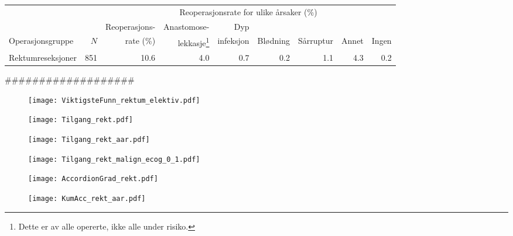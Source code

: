 \documentclass[norsk,a4paper]{article}\usepackage[]{graphicx}\usepackage[]{color}
\begin{document}
\begin{table}[htb]
\begin{minipage}{\textwidth}
\centering
\begin{tabular}{lrrrrrrrr}
  \toprule
  & & & \multicolumn{4}{c}{Reoperasjonsrate for ulike årsaker (\%)} \\
 \cline{4-9} 
 & & Reoperasjons- & Anastomose- & Dyp &&&&  \\
 Operasjonsgruppe & $N$ & rate (\%) & lekkasje\footnote[2]{Dette er av alle opererte, ikke
alle under risiko.} & infeksjon & Blødning & Sårruptur & Annet & Ingen \\
 \midrule
Rektumreseksjoner & 851 & 10.6 & 4.0 & 0.7 & 0.2 & 1.1 & 4.3 & 0.2 \\ 
   \bottomrule
\end{tabular}

\end{minipage}
\end{table}



###################




\begin{figure}[ht]
\centering
\texttt{[image: ViktigsteFunn\_rektum\_elektiv.pdf]}
\caption{}
\end{figure}

\begin{figure}[ht]
\centering
\texttt{[image: Tilgang\_rekt.pdf]}
\caption{}
\end{figure}

\begin{figure}[ht]
\centering
\texttt{[image: Tilgang\_rekt\_aar.pdf]}
\caption{}
\end{figure}

\begin{figure}[ht]
\centering
\texttt{[image: Tilgang\_rekt\_malign\_ecog\_0\_1.pdf]}
\caption{}
\end{figure}

\begin{figure}[ht]
\centering
\texttt{[image: AccordionGrad\_rekt.pdf]}
\caption{}
\end{figure}

\begin{figure}[ht]
\centering
\texttt{[image: KumAcc\_rekt\_aar.pdf]}
\caption{}
\end{figure}
\end{document}

